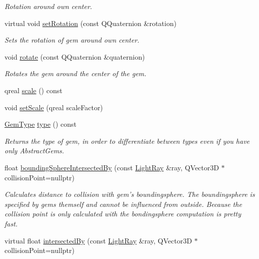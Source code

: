 \begin{DoxyCompactItemize}
\begin{DoxyCompactList}\small\item\em Rotation around own center. \end{DoxyCompactList}\item 
virtual void \hyperlink{class_abstract_gem_afce4d09f74fec117d27b11a220eee6b9}{set\+Rotation} (const Q\+Quaternion \&rotation)
\begin{DoxyCompactList}\small\item\em Sets the rotation of gem around own center. \end{DoxyCompactList}\item 
void \hyperlink{class_abstract_gem_a5ca6867a835dfe2b49d46dbfb933bfca}{rotate} (const Q\+Quaternion \&quaternion)
\begin{DoxyCompactList}\small\item\em Rotates the gem around the center of the gem. \end{DoxyCompactList}\item 
qreal \hyperlink{class_abstract_gem_aadc1c5925331b573d9aba6c2451c9348}{scale} () const 
\item 
void \hyperlink{class_abstract_gem_a23693f4ebb5260cb21141bbcf3f4ff83}{set\+Scale} (qreal scale\+Factor)
\item 
\hyperlink{abstractgem_8h_a2f0a34b6dac35a9610cab7a1c5fcb444}{Gem\+Type} \hyperlink{class_abstract_gem_a4860dda50d7acab4f507505369da19f8}{type} () const 
\begin{DoxyCompactList}\small\item\em Returns the type of gem, in order to differentiate between types even if you have only Abstract\+Gems. \end{DoxyCompactList}\item 
float \hyperlink{class_abstract_gem_a9f945c4f1b76ae90414ed3229d01dd0b}{bounding\+Sphere\+Intersected\+By} (const \hyperlink{class_light_ray}{Light\+Ray} \&ray, Q\+Vector3\+D $\ast$collision\+Point=nullptr)
\begin{DoxyCompactList}\small\item\em Calculates distance to collision with gem's boundingsphere.  The boundingsphere is specified by gems themself and cannot be influenced from outside. Because the collision point is only calculated with the bondingsphere computation is pretty fast. \end{DoxyCompactList}\item 
virtual float \hyperlink{class_abstract_gem_adc52cc6d78f3494563c50cfd7e0584b4}{intersected\+By} (const \hyperlink{class_light_ray}{Light\+Ray} \&ray, Q\+Vector3\+D $\ast$collision\+Point=nullptr)

\end{DoxyCompactItemize}
